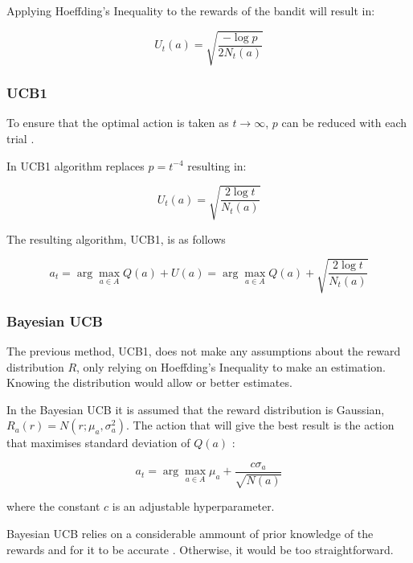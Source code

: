 
Applying Hoeffding's Inequality to the rewards of the bandit will result in:

\begin{displaymath}
    U_t(a) = \sqrt{\frac{-\log p}{2N_t(a)}}
\end{displaymath}

\subsubsection*{UCB1}
To ensure that the optimal action is taken as $t\rightarrow\infty$, $p$ can be
reduced with each trial \cite{kn:Silver}.

In UCB1 algorithm replaces $p=t^{-4}$ resulting in:

\begin{displaymath}
    U_t(a) = \sqrt{\frac{2\log t}{N_t(a)}}
\end{displaymath}

The resulting algorithm, UCB1, is as follows

\begin{displaymath}
a_t = \arg\max_{a\in A}Q(a) + U(a) = \arg\max_{a\in A}Q(a) + \sqrt{\frac{2\log t}{N_t(a)}}
\end{displaymath}

\subsubsection*{Bayesian UCB}
\label{sota:bayesian_ucb}
The previous method, UCB1, does not make any assumptions about the reward
distribution $R$, only relying on Hoeffding's Inequality to make an estimation.
Knowing the distribution would allow or better estimates.

In the Bayesian UCB it is assumed that the reward distribution is Gaussian,
$R_a(r) = N(r;\mu_a,\sigma_a^2)$. The action that will give the best result is the
action that maximises standard deviation of $Q(a)$ \cite{kn:Silver}:

\begin{displaymath}
    a_t = \arg\max_{a\in A}\mu_a + \frac{c\sigma_a}{\sqrt{N(a)}}
\end{displaymath}

where the constant $c$ is an adjustable hyperparameter.

Bayesian UCB relies on a considerable ammount of prior knowledge of the rewards
and for it to be accurate \cite{kn:Silver}. Otherwise, it would be too
straightforward.


